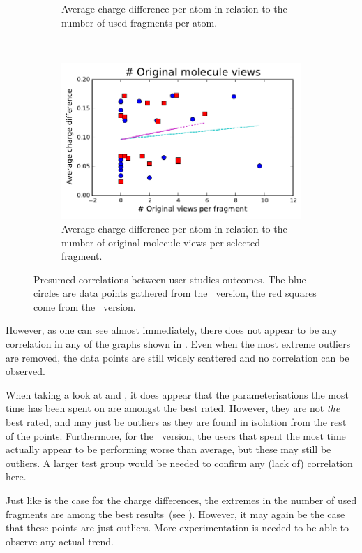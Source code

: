 \begin{figure}[h!]
\begin{subfigure}[t]{0.48\textwidth}
\caption{Average charge difference per atom in relation to the number of used fragments per atom.}
\end{subfigure}%
~
\begin{subfigure}[t]{0.48\textwidth}
\centering
\includegraphics[width=\textwidth]{img/graphs/3a_03.pdf}
\caption{Average charge difference per atom in relation to the number of original molecule views per selected fragment.}
\end{subfigure}
\caption{Presumed correlations between user studies outcomes. The blue circles are data points gathered from the \IDa\ version, the red squares come from the \IDb\ version.}
\end{figure}

However, as one can see almost immediately, there does not appear to be any correlation in any of the graphs shown in . Even when the most extreme outliers are removed, the data points are still widely scattered and no correlation can be observed.

When taking a look at  and , it does appear that the parameterisations the most time has been spent on are amongst the best rated. However, they are not \emph{the} best rated, and may just be outliers as they are found in isolation from the rest of the points. Furthermore, for the \IDb\ version, the users that spent the most time actually appear to be performing worse than average, but these may still be outliers. A larger test group would be needed to confirm any (lack of) correlation here.

Just like is the case for the charge differences, the extremes in the number of used fragments are among the best results~(see ). However, it may again be the case that these points are just outliers. More experimentation is needed to be able to observe any actual trend.

